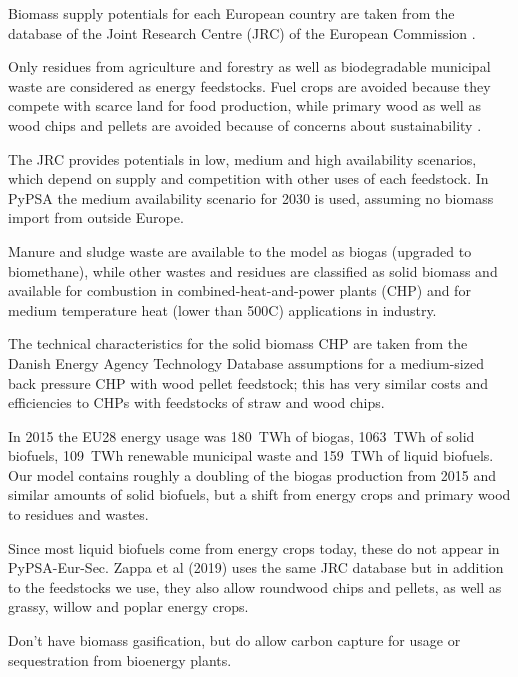 Biomass supply potentials for each European country are taken from the database
of the Joint Research Centre (JRC) of the European Commission
.

Only residues from agriculture and forestry as well as
biodegradable municipal waste are considered as energy feedstocks. Fuel crops
are avoided because they compete with scarce land for food production, while
primary wood as well as wood chips and pellets are avoided because of concerns
about sustainability .

The JRC provides potentials in low,
medium and high availability scenarios, which depend on supply and competition
with other uses of each feedstock. In PyPSA the medium availability scenario for
2030 is used, assuming no biomass import from outside Europe.

Manure and sludge waste are available to the model as biogas (upgraded to
biomethane), while other wastes and residues are classified as solid biomass and
available for combustion in combined-heat-and-power plants (CHP) and for medium
temperature heat (lower than 500\deg{}C) applications in industry.

The technical
characteristics for the solid biomass CHP are taken from the Danish Energy
Agency Technology Database  assumptions for a medium-sized back
pressure CHP with wood pellet feedstock; this has very similar costs and
efficiencies to CHPs with feedstocks of straw and wood chips.

In 2015 the EU28 energy
usage was 180~TWh of biogas, 1063~TWh of solid biofuels, 109~TWh renewable
municipal waste and 159~TWh of liquid biofuels. Our model contains roughly a
doubling of the biogas production from 2015 and similar amounts of solid
biofuels, but a shift from energy crops and primary wood to residues and wastes.

Since most liquid biofuels come from energy crops today, these do not appear in
PyPSA-Eur-Sec. Zappa et al (2019)  uses the same JRC database
but in addition to the feedstocks we use, they also allow roundwood chips and
pellets, as well as grassy, willow and poplar energy crops.

Don't have biomass gasification, but do allow carbon capture for usage or
sequestration from bioenergy plants.


